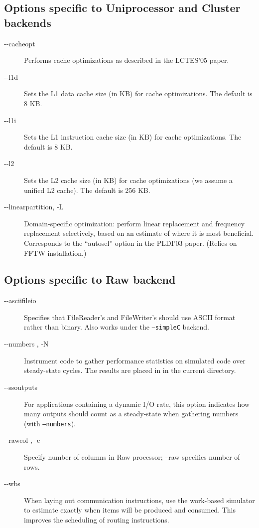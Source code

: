 \subsection*{Options specific to Uniprocessor and Cluster backends}
\begin{description}

\item [-{}-cacheopt]
Performs cache optimizations as described in the LCTES'05 paper.

\item [-{}-l1d ]
Sets the L1 data cache size (in KB) for cache optimizations.  The
default is 8 KB.

\item [-{}-l1i ]
Sets the L1 instruction cache size (in KB) for cache optimizations.
The default is 8 KB.

\item [-{}-l2 ]
Sets the L2 cache size (in KB) for cache optimizations (we assume a
unified L2 cache).  The default is 256 KB.

\item [-{}-linearpartition, -L]
Domain-specific optimization: perform linear replacement and frequency
replacement selectively, based on an estimate of where it is most
beneficial.  Corresponds to the ``autosel'' option in the PLDI'03
paper.  (Relies on FFTW installation.)

\end{description}

\subsection*{Options specific to Raw backend}
\begin{description}
\item[-{}-asciifileio]
Specifies that FileReader's and FileWriter's should use ASCII format
rather than binary.  Also works under the \texttt{--simpleC} backend.

\item [-{}-numbers , -N]
Instrument code to gather performance statistics on simulated code
over  steady-state cycles. The results are placed in
 in the current directory.

\item [-{}-ssoutputs ]
For applications containing a dynamic I/O rate, this option indicates
how many outputs should count as a steady-state when gathering numbers
(with \texttt{--numbers}).

\item [-{}-rawcol , -c]
Specify number of columns in Raw processor; --raw specifies number of rows.

\item [-{}-wbs] When laying out communication instructions, use the 
work-based simulator to estimate exactly when items will be produced
and consumed.  This improves the scheduling of routing instructions.

\end{description}

